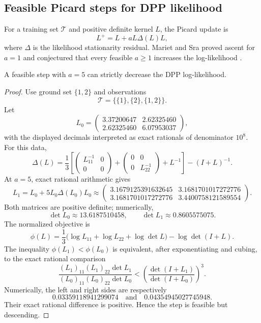\subsection{Feasible Picard steps for DPP likelihood}

For a training set $\mathcal T$ and positive definite kernel $L$, the Picard update is
\[
L^+=L+aL\Delta(L)L,
\]
where $\Delta$ is the likelihood stationarity residual.  Mariet and Sra proved ascent for $a=1$ and conjectured that every feasible $a\ge1$ increases the log-likelihood \cite{MarietSra2015}.

\begin{theorem}\label{thm:dpp}
A feasible step with $a=5$ can strictly decrease the DPP log-likelihood.
\end{theorem}
\begin{proof}
Use ground set $\{1,2\}$ and observations
\[
\mathcal T=\bigl\{\{1\},\{2\},\{1,2\}\bigr\}.
\]
Let
\[
L_0=\begin{pmatrix}3.37200647&2.62325460\\2.62325460&6.07953037\end{pmatrix},
\]
with the displayed decimals interpreted as exact rationals of denominator $10^8$.  For this data,
\[
\Delta(L)=\frac13\left[
\begin{pmatrix}L_{11}^{-1}&0\\0&0\end{pmatrix}
+\begin{pmatrix}0&0\\0&L_{22}^{-1}\end{pmatrix}+L^{-1}\right]-(I+L)^{-1}.
\]
At $a=5$, exact rational arithmetic gives
\[
L_1=L_0+5L_0\Delta(L_0)L_0
\approx\begin{pmatrix}
3.1679125391632645&3.1681701017272776\\
3.1681701017272776&3.4400758121589554
\end{pmatrix}.
\]
Both matrices are positive definite; numerically,
\[
\det L_0\approx13.6187510458,\qquad
\det L_1\approx0.8605575075.
\]
The normalized objective is
\[
\phi(L)=\frac13\bigl(\log L_{11}+\log L_{22}+\log\det L\bigr)-\log\det(I+L).
\]
The inequality $\phi(L_1)<\phi(L_0)$ is equivalent, after exponentiating and cubing, to the exact rational comparison
\[
\frac{(L_1)_{11}(L_1)_{22}\det L_1}{(L_0)_{11}(L_0)_{22}\det L_0}
<\left(\frac{\det(I+L_1)}{\det(I+L_0)}\right)^3.
\]
Numerically, the left and right sides are respectively
\[
0.03359118941299074
\quad\text{and}\quad
0.04354945027745948.
\]
Their exact rational difference is positive.  Hence the step is feasible but descending.
\end{proof}

